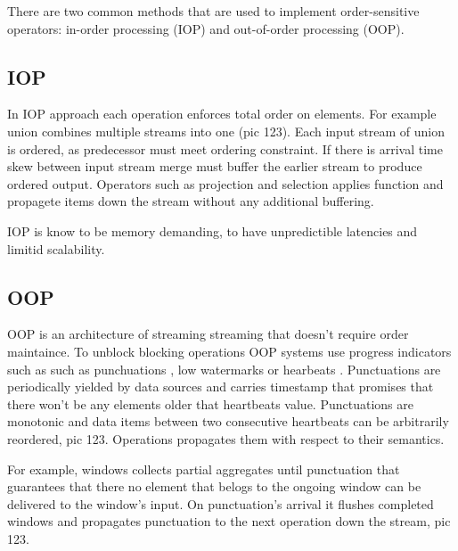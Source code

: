 
\label {fs-typical}

There are two common methods that are used to implement order-sensitive operators: in-order processing (IOP) \cite{Arasu:2006:CCQ:1146461.1146463} \cite{Cranor:2003:GSD:872757.872838} \cite{hammad2004optimizing} and out-of-order processing (OOP)\cite{Li:2008:OPN:1453856.1453890}.

\subsection{IOP}

In IOP approach each operation enforces total order on elements. For example union combines multiple streams into one (pic 123). Each input stream of union is ordered, as predecessor must meet ordering constraint. If there is arrival time skew between input stream merge must buffer the earlier stream to produce ordered output. Operators such as projection and selection applies function and propagete items down the stream without any additional buffering.

IOP is know to be memory demanding, to have unpredictible latencies and limitid scalability.\cite{Li:2008:OPN:1453856.1453890}

\subsection{OOP}

OOP is an architecture of streaming streaming that doesn't require order maintaince. To unblock blocking operations OOP systems use progress indicators such as such as punchuations \cite{Tucker:2003:EPS:776752.776780}, low watermarks \cite{Akidau:2013:MFS:2536222.2536229} or hearbeats \cite{Srivastava:2004:FTM:1055558.1055596}. Punctuations are periodically yielded by data sources and carries timestamp that promises that there won't be any elements older that heartbeats value. Punctuations are monotonic and data items between two consecutive heartbeats can be arbitrarily reordered, pic 123. Operations propagates them with respect to their semantics.

For example, windows collects partial aggregates until punctuation that guarantees that there no element that belogs to the ongoing window can be delivered to the window's input. On punctuation's arrival it flushes completed windows and propagates punctuation to the next operation down the stream, pic 123.
